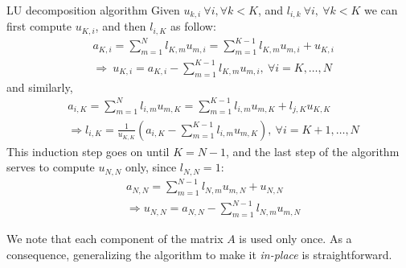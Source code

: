 \begin{section}{LU decomposition algorithm}
  Given $u_{k,i}\ \forall i,\forall k<K$, and $l_{i,k}\ \forall
  i,\ \forall k<K$ we can first compute $u_{K,i}$, and then $l_{i,K}$
  as follow:
  \begin{align}
    &a_{K,i} = \sum_{m = 1}^N l_{K,m}u_{m,i} = \sum_{m=1}^{K-1}l_{K,m}u_{m,i} + u_{K,i}\\
    &\Longrightarrow\ u_{K,i} = a_{K,i} - \sum_{m=1}^{K-1}l_{K,m}u_{m,i},\ \forall i = K, \dots, N
  \end{align}
  and similarly,
  \begin{align}
    &a_{i,K} = \sum_{m=1}^N l_{i,m}u_{m,K} = \sum_{m=1}^{K-1} l_{i,m}u_{m,K}+l_{j,K}u_{K,K}\\
    &\Longrightarrow l_{i,K} = \frac{1}{u_{K,K}} \left(a_{i,K}-\sum_{m=1}^{K-1} l_{i,m}u_{m,K}\right),\ \forall i = K+1,\dots,N
  \end{align}
  This induction step goes on until $K = N-1$, and the last step of
  the algorithm serves to compute $u_{N,N}$ only, since $l_{N,N} = 1$:
  \begin{align}
    &a_{N,N} = \sum_{m=1}^{N-1}l_{N,m}u_{m,N} + u_{N,N}\\
    &\Longrightarrow u_{N,N} = a_{N,N}-\sum_{m=1}^{N-1}l_{N,m}u_{m,N}
  \end{align}

  We note that each component of the matrix $A$ is used only once. As
  a consequence, generalizing the algorithm to make it {\em in-place}
  is straightforward.
\end{section}

